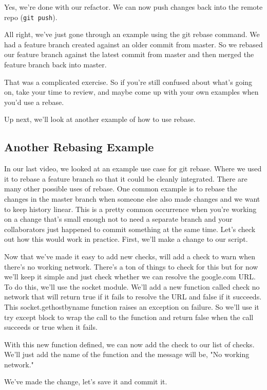 	Yes, we're done with our refactor. We can now push changes back into the remote repo (\verb|git push|).
	
	All right, we've just gone through an example using the git rebase command. We had a feature branch created against an older commit from master. So we rebased our feature branch against the latest commit from master and then merged the feature branch back into master.
	
	That was a complicated exercise. So if you're still confused about what's going on, take your time to review, and maybe come up with your own examples when you'd use a rebase.
	
	Up next, we'll look at another example of how to use rebase.

	\subsection{Another Rebasing Example} \label{W303d}

	In our last video, we looked at an example use case for git rebase. Where we used it to rebase a feature branch so that it could be cleanly integrated. There are many other possible uses of rebase. One common example is to rebase the changes in the master branch when someone else also made changes and we want to keep history linear. This is a pretty common occurrence when you're working on a change that's small enough not to need a separate branch and your collaborators just happened to commit something at the same time. Let's check out how this would work in practice. First, we'll make a change to our script.
	
	Now that we've made it easy to add new checks, will add a check to warn when there's no working network. There's a ton of things to check for this but for now we'll keep it simple and just check whether we can resolve the google.com URL. To do this, we'll use the socket module. We'll add a new function called check no network that will return true if it fails to resolve the URL and false if it succeeds. This socket.gethostbyname function raises an exception on failure. So we'll use it try except block to wrap the call to the function and return false when the call succeeds or true when it fails.
	
	With this new function defined, we can now add the check to our list of checks. We'll just add the name of the function and the message will be, "No working network."
	
	We've made the change, let's save it and commit it.
	
